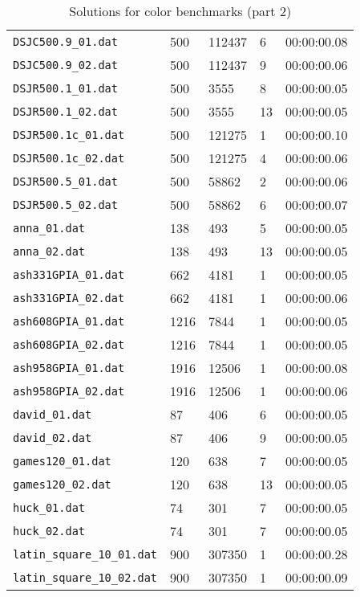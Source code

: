 \documentclass{article}
\begin{document}
\begin{table}
\begin{tabular}{y{3.6cm}x{1cm}x{1.5cm}x{1.5cm}y{1.5cm}}
    \verb|DSJC500.9_01.dat| & 500 & 112437 & 6 & 00:00:00.08 \\
    \verb|DSJC500.9_02.dat| & 500 & 112437 & 9 & 00:00:00.06 \\
    \verb|DSJR500.1_01.dat| & 500 & 3555 & 8 & 00:00:00.05 \\
    \verb|DSJR500.1_02.dat| & 500 & 3555 & 13 & 00:00:00.05 \\
    \verb|DSJR500.1c_01.dat| & 500 & 121275 & 1 & 00:00:00.10 \\
    \verb|DSJR500.1c_02.dat| & 500 & 121275 & 4 & 00:00:00.06 \\
    \verb|DSJR500.5_01.dat| & 500 & 58862 & 2 & 00:00:00.06 \\
    \verb|DSJR500.5_02.dat| & 500 & 58862 & 6 & 00:00:00.07 \\
    \verb|anna_01.dat| & 138 & 493 & 5 & 00:00:00.05 \\
    \verb|anna_02.dat| & 138 & 493 & 13 & 00:00:00.05 \\
    \verb|ash331GPIA_01.dat| & 662 & 4181 & 1 & 00:00:00.05 \\
    \verb|ash331GPIA_02.dat| & 662 & 4181 & 1 & 00:00:00.06 \\
    \verb|ash608GPIA_01.dat| & 1216 & 7844 & 1 & 00:00:00.05 \\
    \verb|ash608GPIA_02.dat| & 1216 & 7844 & 1 & 00:00:00.05 \\
    \verb|ash958GPIA_01.dat| & 1916 & 12506 & 1 & 00:00:00.08 \\
    \verb|ash958GPIA_02.dat| & 1916 & 12506 & 1 & 00:00:00.06 \\
    \verb|david_01.dat| & 87 & 406 & 6 & 00:00:00.05 \\
    \verb|david_02.dat| & 87 & 406 & 9 & 00:00:00.05 \\
    \verb|games120_01.dat| & 120 & 638 & 7 & 00:00:00.05 \\
    \verb|games120_02.dat| & 120 & 638 & 13 & 00:00:00.05 \\
    \verb|huck_01.dat| & 74 & 301 & 7 & 00:00:00.05 \\
    \verb|huck_02.dat| & 74 & 301 & 7 & 00:00:00.05 \\
    \verb|latin_square_10_01.dat| & 900 & 307350 & 1 & 00:00:00.28 \\
    \verb|latin_square_10_02.dat| & 900 & 307350 & 1 & 00:00:00.09 \\
  \end{tabular}
  \caption{Solutions for color benchmarks (part 2)}
\end{table}
\end{document}
